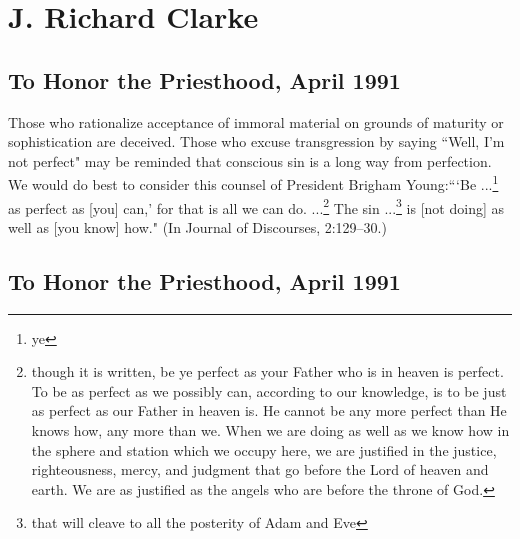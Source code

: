 \section{J. Richard Clarke}

\subsection{To Honor the Priesthood, April 1991}

Those who rationalize acceptance of immoral material on grounds of maturity or sophistication are deceived. Those who excuse transgression by saying ``Well, I'm not perfect" may be reminded that conscious sin is a long way from perfection. We would do best to consider this counsel of President Brigham Young:```Be ...\footnote{ye} as perfect as [you] can,' for that is all we can do. ...\footnote{though it is written, be ye perfect as your Father who is in heaven is perfect. To be as perfect as we possibly can, according to our knowledge, is to be just as perfect as our Father in heaven is. He cannot be any more perfect than He knows how, any more than we. When we are doing as well as we know how in the sphere and station which we occupy here, we are justified in the justice, righteousness, mercy, and judgment that go before the Lord of heaven and earth. We are as justified as the angels who are before the throne of God.} The sin ...\footnote{that will cleave to all the posterity of Adam and Eve} is [not doing] as well as [you know] how." (In Journal of Discourses, 2:129–30.)

\subsection{To Honor the Priesthood, April 1991}

